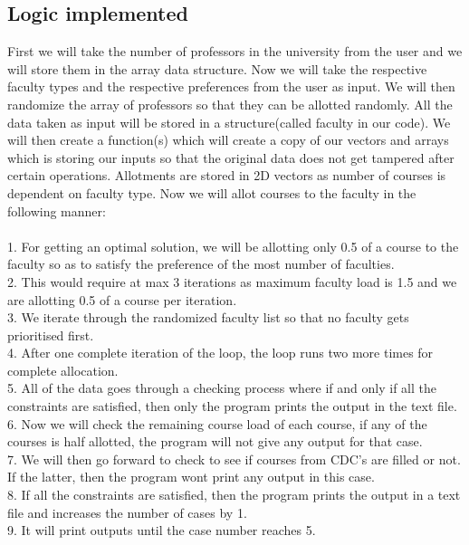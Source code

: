 \documentclass{article}
\begin{document}
\subsection{
Logic implemented 
}
First we will take the number of professors in the university from the user and we will store them in the array data structure. Now we will take the respective faculty types and the respective preferences from the user as input. We will then randomize the array of professors so that they can be allotted randomly. All the data taken as input will be stored in a structure(called faculty in our code). We will then create a function(s) which will create a copy of our vectors and arrays which is storing our inputs so that the original data does not get tampered after certain operations. Allotments are stored in 2D vectors as number of courses is dependent on faculty type. Now we will allot courses to the faculty in the following manner:\\ \\
1. For getting an optimal solution, we will be allotting only 0.5 of a course to the faculty so as to satisfy the preference of the most number of faculties.\\
2. This would require at max 3 iterations as maximum faculty load is 1.5 and we are allotting 0.5 of a course per iteration.\\
3. We iterate through the randomized faculty list so that no faculty gets prioritised first.\\
4. After one complete iteration of the loop, the loop runs two more times for complete allocation.\\
5. All of the data goes through a checking process where if and only if all the constraints are satisfied, then only the program prints the output in the text file.\\
6. Now we will check the remaining course load of each course, if any of the courses is half allotted, the program will not give any output for that case.\\
7. We will then go forward to check to see if courses from CDC's are filled or not. If the latter, then the program wont print any output in this case.\\
8. If all the constraints are satisfied, then the program prints the output in a text file and increases the number of cases by 1.\\
9. It will print outputs until the case number reaches 5.\\
\end{document}

